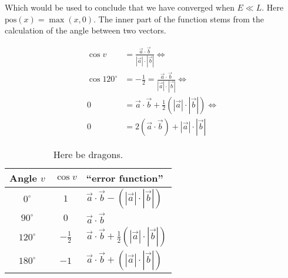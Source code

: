 Which would be used to conclude that we have converged when $E \ll L$. Here
$\text{pos}(x) = \max(x, 0)$. The inner part of the function stems from the
calculation of the angle between two vectors.

\begin{align}
  \label{eq:2}
  \cos v &= \frac{\vec a \cdot \vec b}{|\vec a| \cdot |\vec b|} \Leftrightarrow
  \\
  \cos 120^{\circ} &= -\frac{1}{2} = \frac{\vec a \cdot \vec b}{|\vec a| \cdot |\vec b|} \Leftrightarrow
  \\
  0 &= \vec a \cdot \vec b + \frac{1}{2} (|\vec a| \cdot |\vec b|) \Leftrightarrow
  \\
  0 &= 2 (\vec a \cdot \vec b) + |\vec a| \cdot |\vec b|
\end{align}

\begin{table}[htbp]
  \centering
  \begin{tabular}{ccl}
    \toprule
    Angle $v$     & $\cos v$       & ``error function''                     \\
    \midrule
    $0^{\circ}$   & $1$            & $\vec a \cdot \vec b -
                                     (|\vec a| \cdot |\vec b|)$             \\
    $90^{\circ}$  & $0$            & $\vec a \cdot \vec b$                  \\
    $120^{\circ}$ & $-\frac{1}{2}$ & $\vec a \cdot \vec b +
                                     \frac{1}{2} (|\vec a| \cdot |\vec b|)$ \\
    $180^{\circ}$ & $-1$           & $\vec a \cdot \vec b +
                                     (|\vec a| \cdot |\vec b|)$             \\
    \bottomrule
  \end{tabular}
  \caption[Here be dragons.]{Here be dragons.\label{tab:error-functions}}
\end{table}


\chapterbreak{}

